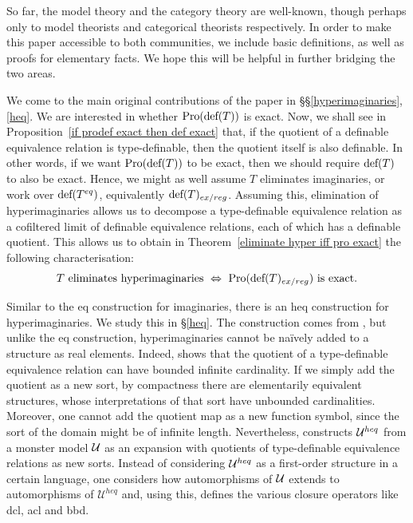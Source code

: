 \smallskip

So far, the model theory and the category theory are well-known, though perhaps only to model theorists and categorical theorists respectively. In order to make this paper accessible to both communities, we include basic definitions, as well as proofs for elementary facts. We hope this will be helpful in further bridging the two areas.

\smallskip

We come to the main original contributions of the paper in \S\S\ref{hyperimaginaries}, \ref{heq}. We are interested in whether $\textup{Pro}(\textup{def}(T))$ is exact. Now, we shall see in Proposition~\ref{if prodef exact then def exact} that, if the quotient of a definable equivalence relation is type-definable, then the quotient itself is also definable. In other words, if we want $\textup{Pro}(\textup{def}(T))$ to be exact, then we should require $\textup{def}(T)$ to also be exact. Hence, we might as well assume $T$ eliminates imaginaries, or work over $\textup{def}(T^{eq})$, equivalently $\textup{def}(T)_{ex/reg}$. Assuming this, elimination of hyperimaginaries allows us to decompose a type-definable equivalence relation as a cofiltered limit of definable equivalence relations, each of which has a definable quotient. This allows us to obtain in Theorem~\ref{eliminate hyper iff pro exact} the following characterisation:
\[T \textup{ eliminates hyperimaginaries } \Leftrightarrow \ \textup{Pro}(\textup{def}(T)_{ex/reg}) \textup{ is exact.}\]

Similar to the eq construction for imaginaries, there is an heq construction for hyperimaginaries. We study this in \S\ref{heq}. The construction comes from \cite{Hart2000-HARCAC-24}, but unlike the eq construction, hyperimaginaries cannot be na\"{i}vely added to a structure as real elements. Indeed, \cite[Example 3.1.6]{alma992983361725701631} shows that the quotient of a type-definable equivalence relation can have bounded infinite cardinality. If we simply add the quotient as a new sort, by compactness there are elementarily equivalent structures, whose interpretations of that sort have unbounded cardinalities. Moreover, one cannot add the quotient map as a new function symbol, since the sort of the domain might be of infinite length. Nevertheless, \cite{Hart2000-HARCAC-24} constructs $\mathcal{U}^{heq}$ from a monster model $\mathcal{U}$ as an expansion with quotients of type-definable equivalence relations as new sorts. Instead of considering $\mathcal{U}^{heq}$ as a first-order structure in a certain language, one considers how automorphisms of $\mathcal{U}$ extends to automorphisms of $\mathcal{U}^{heq}$ and, using this, defines the various closure operators like dcl, acl and bbd.

